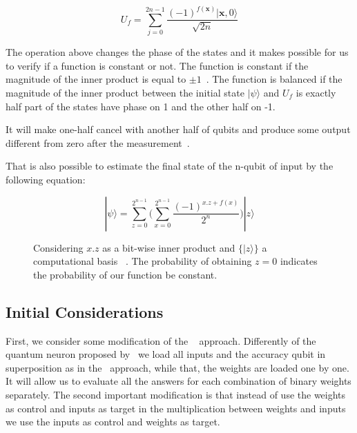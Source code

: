 \documentclass[conference]{IEEEtran}
\begin{document}
 \begin{equation}
    U_f = \sum_{j=0}^{2n-1} \frac{{(-1)}^{f(\textbf{x})}|\textbf{x},0\rangle}{\sqrt{2n}}
 \end{equation}

 The operation above changes the phase of the states and it makes possible for us to verify if a function is constant or
 not.
 The function is constant if the magnitude of the inner product is equal to
 \(\pm 1\)~\cite{deutsch1992rapid,yanofsky2008quantum}.
 The function is balanced if the magnitude of the inner product between the initial state \(|\psi\rangle\)
 and \(U_f\) is exactly half part of the states have phase on 1 and the other half on -1.

 It will make one-half cancel with another half of qubits and produce some output different from zero after the
 measurement~\cite{deutsch1992rapid,nielsen2002quantum}.

 That is also possible to estimate the final state of the n-qubit of input by the following equation:

\renewcommand{\figurename}{Fig.}
 \begin{figure}[ht!]
     \begin{equation}
        |\psi\rangle = \sum_{z=0}^{2^{n-1}} \Bigg(\sum_{x=0}^{2^{n-1}} \frac{{(-1)}^{x.z +f(x)}}{2^n}\Bigg)|z\rangle
    \end{equation}
     \caption{Considering \(x.z\) as a bit-wise inner product and \(\{|z\rangle\}\) a computational basis
     ~\cite{benatti2003deciding}.
     The probability of obtaining \(z=0\) indicates the probability of our function be constant.}
 \end{figure}

\subsection{Initial Considerations}\label{subsec:quantum-neuron-evaluation}

 First, we consider some modification of the ~\cite{fawaz2019training} approach.
Differently of the quantum neuron proposed by~\cite{fawaz2019training} we load all inputs and the accuracy qubit in
superposition as in the~\cite{Trugenberger_2001} approach, while that, the weights are loaded one by one.
It will allow us to evaluate all the answers for each combination of binary weights separately.
The second important modification is that instead of use the weights as control and inputs as target in the multiplication
between weights and inputs we use the inputs as control and weights as target.
\end{document}
